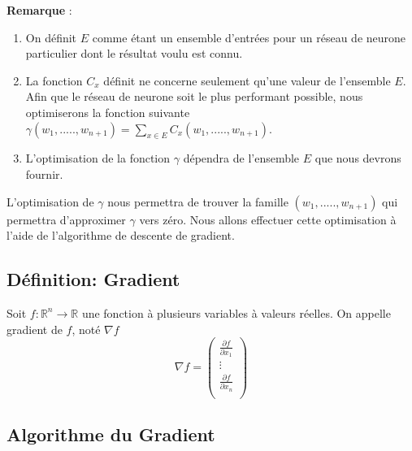 \documentclass{article}
\begin{document}
 \textbf{Remarque }: 
	\begin{enumerate} %
		\item On définit $E$ comme étant un ensemble d'entrées pour un réseau de neurone particulier dont le résultat voulu est connu. 
		\item La fonction $C_{x}$ définit ne concerne seulement qu'une valeur de l'ensemble $E$. Afin que le réseau de neurone soit le plus performant possible, nous optimiserons la fonction suivante $\gamma(w_1,.....,w_{n+1}) = \sum_{x \in E} C_{x}(w_1,.....,w_{n+1})$.
		\item L'optimisation de la fonction $\gamma$ dépendra de l'ensemble $E$ que nous devrons fournir. 
	\end{enumerate}

L'optimisation de $\gamma$ nous permettra de trouver la famille $(w_1,.....,w_{n+1})$ qui permettra d'approximer $\gamma$ vers zéro. Nous allons effectuer cette optimisation à l'aide de l'algorithme de descente de gradient.

	\subsection{Définition: Gradient}
		Soit $f: \mathbb{R}^{n} \to \mathbb{R}$ une fonction à plusieurs variables à valeurs réelles. On appelle gradient de $f$, noté $\nabla f$
		\[ \nabla f= \begin{pmatrix} 
					\frac{\partial f}{\partial x_1} \\
					\vdots\\	
					\frac{\partial f}{\partial x_n}\\
				 \end{pmatrix} \] 

\subsection{Algorithme du Gradient}
 	
\end{document}
